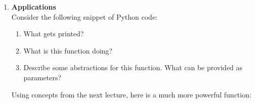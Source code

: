 \documentclass{article}
\newcounter{points}
\newcommand\printpoints{Total number of points: \thepoints}
\begin{document}
\begin{enumerate}
\begin{enumerate}
\setcounter{enumii}{4}
\item 
\end{enumerate}

\item \textbf{Applications} \\
Consider the following snippet of Python code: \\



\begin{enumerate}
\item What gets printed?
\end{enumerate}

\begin{enumerate}
\setcounter{enumii}{1}
\item What is this function doing?
\end{enumerate}

\begin{enumerate}
\setcounter{enumii}{2}
\item Describe some abstractions for this function.  What can be provided as parameters?
\end{enumerate}

Using concepts from the next lecture, here is a much more powerful function:

\begin{center}
\begin{tabular}{c}

\end{tabular}
\end{center}



\end{enumerate}
\end{document}
